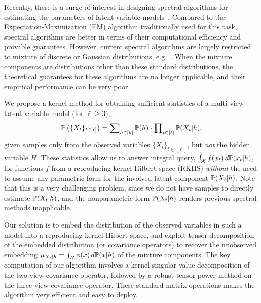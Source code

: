 \documentclass{article}
\begin{document}
\setlength{\abovedisplayskip}{4pt}
\setlength{\abovedisplayshortskip}{1pt}
\setlength{\belowdisplayskip}{4pt}
\setlength{\belowdisplayshortskip}{1pt}
\setlength{\jot}{3pt}

\setlength{\textfloatsep}{3ex}

Recently, there is a surge of interest in designing spectral algorithms for estimating the parameters of latent variable models~\citep{HsuKakZha09,ParSonXin11,SonParXin11,FosRodUng12,AnandkumarEtal:tensor12, AnandkumarEtal:twosvd12, Franz13}. Compared to the Expectation-Maximization (EM) algorithm \citep{DemLaiRub77} traditionally used for this task, spectral algorithms are better in terms of their computational efficiency and provable guarantees.
However, current spectral algorithms are largely restricted to mixture
of discrete or Gaussian distributions, e.g.~\citep{AnandkumarEtal:tensor12,HsuKak13}. When the mixture components are distributions other than these standard distributions, the theoretical guarantees for these algorithms are no longer applicable, and their empirical performance can be very poor.

We propose a kernel method for obtaining sufficient statistics of a multi-view latent variable model (for $\ell\geq 3$),
\begin{align}
  \mathbb{P}\left(\{X_t\}_{t \in [\ell]}\right)=\sum\nolimits_{h \in [k]} \mathbb{P}(h) \cdot \prod\nolimits_{t \in [\ell]} \mathbb{P}(X_t|h),
  \label{eq:multiview_model}
\end{align}
given samples only from the observed variables $\{X_t\}_{t \in [\ell]}$, but \emph{not} the hidden variable $H$. These statistics allow us to answer integral query, $\int_{\mathcal{X}} f(x_t)\, d \mathbb{P}(x_t|h)$, for functions $f$ from a reproducing kernel Hilbert space (RKHS) \emph{without} the need to assume any parametric form for the involved latent component $\mathbb{P}(X_t|h)$.
Note that this is a very challenging problem, since we do not have samples to directly estimate $\mathbb{P}(X_t|h)$, and the nonparametric form $\mathbb{P}(X_t|h)$ renders previous spectral methods inapplicable.

Our solution is to embed the distribution of the observed variables in such a model into a reproducing kernel Hilbert space, and exploit tensor decomposition of the embedded distribution (or covariance operators)
to recover the unobserved embedding $\mu_{X_t|h}=\int_{\mathcal{X}} \phi(x)\, d\mathbb{P}(x|h)$ of the mixture components. The key computation of our algorithm involves a kernel singular value decomposition of the two-view covariance operator, followed by a robust tensor power method on the three-view covariance operator. These standard matrix operations makes the algorithm very efficient and easy to deploy.
\end{document}
